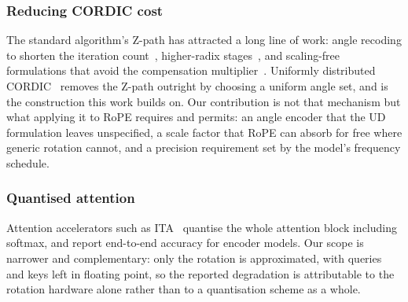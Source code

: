 \subsubsection{Reducing CORDIC cost}
The standard algorithm's Z-path has attracted a long line of work: angle
recoding to shorten the iteration count~\cite{c1}, higher-radix
stages~\cite{c12}, and scaling-free formulations that avoid the compensation
multiplier~\cite{c11, c12}. Uniformly distributed CORDIC~\cite{ud} removes the
Z-path outright by choosing a uniform angle set, and is the construction this
work builds on. Our contribution is not that mechanism but what applying it to
RoPE requires and permits: an angle encoder that the UD formulation leaves
unspecified, a scale factor that RoPE can absorb for free where generic
rotation cannot, and a precision requirement set by the model's frequency
schedule.

\subsubsection{Quantised attention}
Attention accelerators such as ITA~\cite{c8} quantise the whole attention
block including softmax, and report end-to-end accuracy for encoder models.
Our scope is narrower and complementary: only the rotation is approximated,
with queries and keys left in floating point, so the reported degradation is
attributable to the rotation hardware alone rather than to a quantisation
scheme as a whole.

